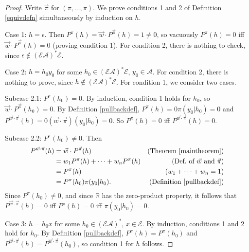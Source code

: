 \documentclass[twoside]{article}
\begin{document}
\begin{proof}
    Write $\vec\pi$ for $(\pi,\ldots,\pi)$.
    We prove conditions 1 and 2 of Definition \ref{equivdefn}
    simultaneously by induction on $h$.
 
    Case 1: $h=\epsilon$. Then
    $P^\pi(h)=\vec w\cdot{P^{\vec\pi}}(h)=1\not=0$, so
    vacuously $P^\pi(h)=0$ iff $\vec w\cdot{P^{\vec\pi}}(h)=0$
    (proving condition 1).
    For condition 2, there is nothing to check, since
    $\epsilon\not\in(\mathcal E\mathcal A)^*\mathcal E$.

    Case 2: $h=h_0y_0$ for some
        $h_0\in(\mathcal E\mathcal A)^*\mathcal E$, $y_0\in\mathcal A$.
        For condition 2, there is nothing to prove, since
        $h\not\in(\mathcal E\mathcal A)^*\mathcal E$.
        For condition 1, we consider two cases.

        Subcase 2.1: $P^\pi(h_0)=0$.
        By induction, condition 1 holds for $h_0$, so
        $\vec w\cdot{P^{\vec\pi}}(h_0)=0$.
        By Definition \ref{pullbackdef},
        $P^\pi(h)=0\pi(y_0|h_0)=0$
        and $P^{\vec w\cdot\vec\pi}(h)=0(\vec w\cdot\vec\pi)(y_0|h_0)=0$.
        So $P^\pi(h)=0$ iff $P^{\vec w\cdot\vec\pi}(h)=0$.

        Subcase 2.2: $P^\pi(h_0)\not=0$.
        Then
        \begin{align*}
            P^{\vec w\cdot \vec\pi}(h)
                &= \vec w\cdot{P^{\vec\pi}}(h)
                    &\mbox{(Theorem \ref{maintheorem})}\\
                &= w_1 P^\pi(h)+\cdots+w_n P^\pi(h)
                    &\mbox{(Def.\ of $\vec w$ and $\vec\pi$)}\\
                &= P^\pi(h)
                    &\mbox{($w_1+\cdots+w_n=1$)}\\
                &= P^\pi(h_0)\pi(y_0|h_0).
                    &\mbox{(Definition \ref{pullbackdef})}
        \end{align*}
        Since $P^\pi(h_0)\not=0$, and since $\mathbb R$ has the zero-product property,
        it follows that
        $P^{\vec w\cdot\vec\pi}(h)=0$ iff $P^\pi(h)=0$ iff $\pi(y_0|h_0)=0$.

    Case 3: $h=h_0x$ for some $h_0\in (\mathcal E\mathcal A)^*$,
        $x\in\mathcal E$.
        By induction, conditions 1 and 2 hold for $h_0$.
        By Definition \ref{pullbackdef},
        $P^\pi(h)=P^\pi(h_0)$ and
        $P^{\vec w\cdot\vec\pi}(h)=P^{\vec w\cdot\vec\pi}(h_0)$,
        so condition 1 for $h$ follows.


\end{proof}
\end{document}
